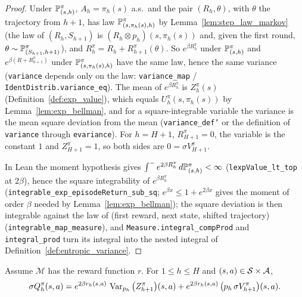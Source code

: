 \begin{proof}
\leanok
Under $\mathbb{P}^\pi_{(s,h)}$, $A_h = \pi_h(s)$ a.s.\ and the pair $(R_h, \theta)$, with $\theta$
the trajectory from $h + 1$, has law $\mathbb{P}^\pi_{(s, \pi_h(s), h)}$ by
Lemma~\ref{lem:step_law_markov} (the law of $(R_h, S_{h+1})$ is $(R_h \otimes p_h)(s, \pi_h(s))$
and, given the first round, $\theta \sim \mathbb{P}^\pi_{(S_{h+1}, h+1)}$), and
$R^\pi_h = R_h + R^\pi_{h+1}(\theta)$. So $e^{\beta R^\pi_h}$ under $\mathbb{P}^\pi_{(s,h)}$ and
$e^{\beta(R + R^\pi_{h+1})}$ under $\mathbb{P}^\pi_{(s, \pi_h(s), h)}$ have the same law, hence the same
variance (\texttt{variance} depends only on the law: \texttt{variance\_map} /
\texttt{IdentDistrib.variance\_eq}). The mean of $e^{\beta R^\pi_h}$ is $Z^\pi_h(s)$
(Definition~\ref{def:exp_value}), which equals $U^\pi_h(s, \pi_h(s))$ by
Lemma~\ref{lem:exp_bellman}, and for a square-integrable variable the variance is the mean
square deviation from the mean (\texttt{variance\_def'} or the definition of
\texttt{variance} through \texttt{evariance}). For $h = H + 1$, $R^\pi_{H+1} = 0$, the variable
is the constant $1$ and $Z^\pi_{H+1} = 1$, so both sides are $0 = \sigma V^\pi_{H+1}$.

In Lean the moment hypothesis gives $\int^- e^{2\beta R^\pi_h}\,d\mathbb{P}^\pi_{(s,h)} < \infty$
(\texttt{lexpValue\_lt\_top} at $2\beta$), hence the square integrability of $e^{\beta R^\pi_h}$
(\texttt{integrable\_exp\_episodeReturn\_sub\_sq}; $e^{\beta x} \le 1 + e^{2\beta x}$ gives the moment
of order $\beta$ needed by Lemma~\ref{lem:exp_bellman}); the square deviation is then integrable
against the law of (first reward, next state, shifted trajectory)
(\texttt{integrable\_map\_measure}), and \texttt{Measure.integral\_compProd} and
\texttt{integral\_prod} turn its integral into the nested integral of
Definition~\ref{def:entropic_variance}.
\end{proof}

\begin{lemma}\label{lem:entropic_variance_recursion}
\leanok
{}
Assume $\mathcal M$ has the reward function $r$. For $1 \le h \le H$ and $(s,a) \in \mathcal{S}\times\mathcal{A}$,
\[
  \sigma Q^\pi_h(s, a) = e^{2\beta r_h(s,a)}\,\operatorname{Var}_{p_h}\big(Z^\pi_{h+1}\big)(s,a)
  + e^{2\beta r_h(s,a)}\,\big(p_h\,\sigma V^\pi_{h+1}\big)(s,a) .
\]
\end{lemma}

